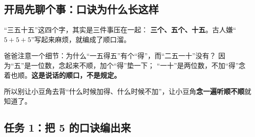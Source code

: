 \subsection{开局先聊个事：口诀为什么长这样}

“三五十五”这四个字，其实是三件事压在一起：
\textbf{三个、五个、十五}。古人嫌“$5+5+5$”写起来麻烦，就编成了顺口溜。

爸爸注意一个细节：为什么“一五得五”有个“得”，而“二五一十”没有？
因为“五”是一位数，念起来不顺，加个“得”垫一下；
“一十”是两位数，不加“得”念着也顺。\textbf{这是说话的顺口，不是规定。}

所以别让小豆角去背“什么时候加得、什么时候不加”，让小豆角\textbf{念一遍听顺不顺}就知道了。

\subsection{任务 1：把 5 的口诀编出来}

